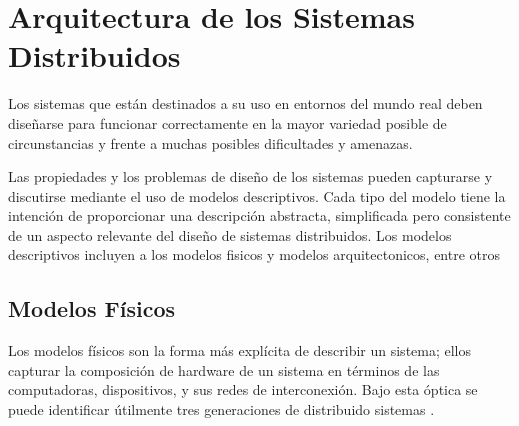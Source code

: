 
\setchapterpreamble[u]{\margintoc}

\chapter{Arquitectura de los Sistemas Distribuidos}
\label{ch:arq-SD}

Los sistemas que están destinados a su uso en entornos del mundo real deben diseñarse para funcionar correctamente en la mayor variedad posible de circunstancias y frente a muchas posibles dificultades y amenazas.
 
Las propiedades y los problemas de diseño de los sistemas pueden capturarse y discutirse mediante el uso de \gls{modelos  descriptivos}. Cada tipo del modelo tiene la intención de proporcionar una descripción abstracta, simplificada pero consistente de un aspecto relevante del diseño de sistemas distribuidos. Los modelos descriptivos incluyen a los \gls{modelos fisicos} y  \gls{modelos arquitectonicos}, entre otros 
 
\section{Modelos F\'isicos}
\label{sec:fisico-SD}

Los modelos físicos son la forma más explícita de describir un sistema; ellos capturar la composición de hardware de un sistema en términos de las computadoras, dispositivos, y sus redes de interconexión.
Bajo esta óptica se puede identificar útilmente tres generaciones de distribuido sistemas . 

